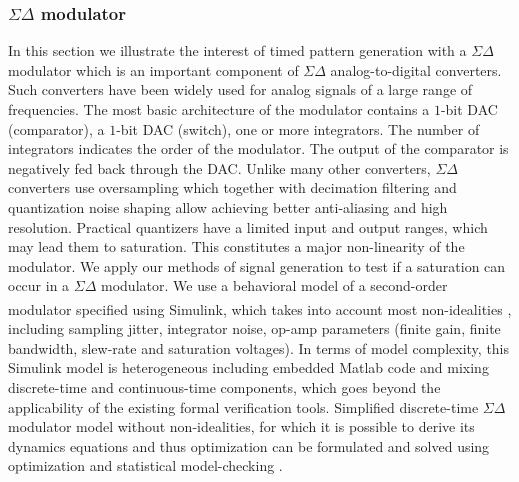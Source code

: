 \subsubsection{$\Sigma \Delta$ modulator}
In this section we illustrate the interest of timed pattern generation with a $\Sigma \Delta$ modulator which is an important component of $\Sigma \Delta$ analog-to-digital converters. Such converters have been widely used for analog signals of a large range of frequencies. The most basic architecture of the modulator contains a $1$-bit DAC (comparator), a $1$-bit DAC (switch), one or more integrators. The number of integrators indicates the order of the modulator. The output of the comparator is negatively fed back through the DAC. Unlike many other converters, $\Sigma \Delta$ converters use oversampling which together with decimation filtering and quantization noise shaping allow achieving better anti-aliasing and high resolution. Practical quantizers have a limited input and output ranges, which may lead them to saturation. This constitutes a major non-linearity of the modulator. We apply our methods of signal generation to test if a saturation can occur in a $\Sigma \Delta$ modulator. We use a behavioral model of a second-order modulator specified using Simulink\textsuperscript{\textregistered}, which takes into account most non-idealities \cite{Brigati99}, including sampling jitter, integrator noise, op-amp parameters (finite gain, finite bandwidth, slew-rate and saturation voltages). In terms of model complexity, this Simulink model is heterogeneous including embedded Matlab code and mixing discrete-time and continuous-time components, which goes beyond the applicability of the existing formal verification tools. Simplified discrete-time $\Sigma \Delta$ modulator model without non-idealities, for which it is possible to derive its dynamics equations and thus optimization can be formulated and solved using optimization \cite{DangDM04} and statistical model-checking \cite{ClarkeDL10}.

